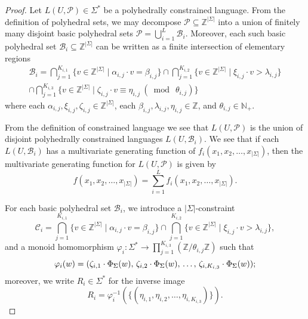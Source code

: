 \begin{proof}	
	Let $L(U,\mathcal{P}) \in \Sigma^*$ be a polyhedrally constrained language.
	From the definition of polyhedral sets, we may decompose $\mathcal{P} \subseteq \mathbb{Z}^{|\Sigma|}$ into a union of finitely many disjoint basic polyhedral sets
	$\mathcal{P} = \bigcup_{i=1}^L \mathcal{B}_i$.
	Moreover, each such basic polyhedral set $\mathcal{B}_i \subseteq \mathbb{Z}^{|\Sigma|}$ can be written as a finite intersection of elementary regions
	\begin{multline*}
		\mathcal{B}_i
		=
		\bigcap_{j = 1}^{K_{i,1}}
		\{
			v \in \mathbb{Z}^{|\Sigma|}
		\mid
			\alpha_{i,j} \cdot v = \beta_{i,j}
		\}
		\cap
		\bigcap_{j = 1}^{K_{i,2}}
		\{
			v \in \mathbb{Z}^{|\Sigma|}
		\mid
			\xi_{i,j} \cdot v > \lambda_{i,j}
		\}
		\\\cap
		\bigcap_{j = 1}^{K_{i,3}}
		\{
			v \in \mathbb{Z}^{|\Sigma|}
		\mid
			\zeta_{i,j} \cdot v \equiv \eta_{i,j}\ (\bmod\ \theta_{i,j})
		\}
	\end{multline*}
	where each $\alpha_{i,j},\xi_{i,j},\zeta_{i,j} \in \mathbb{Z}^{|\Sigma|}$, each $\beta_{i,j},\lambda_{i,j}, \eta_{i,j} \in \mathbb{Z}$, and $\theta_{i,j} \in \mathbb{N}_+$.
	
	From the definition of constrained language we see that $L(U,\mathcal{P})$ is the union of disjoint polyhedrally constrained languages $L(U,\mathcal{B}_i)$.
	We see that if each $L(U,\mathcal{B}_i)$ has a multivariate generating function of $f_i(x_1,x_2,\ldots,x_{|\Sigma|})$, then the multivariate generating function for $L(U,\mathcal{P})$ is given by
	\[
		f(x_1,x_2,\ldots,x_{|\Sigma|})
		=
		\sum_{i=1}^L f_i(x_1,x_2,\ldots,x_{|\Sigma|}).
	\]
	
	For each basic polyhedral set $\mathcal{B}_i$, we introduce a $|\Sigma|$-constraint
	\[
		\mathcal{C}_i
		=
		\bigcap_{j = 1}^{K_{i,1}}
		\{
			v \in \mathbb{Z}^{|\Sigma|}
		\mid
			\alpha_{i,j} \cdot v = \beta_{i,j}
		\}
		\cap
		\bigcap_{j = 1}^{K_{i,2}}
		\{
			v \in \mathbb{Z}^{|\Sigma|}
		\mid
			\xi_{i,j} \cdot v > \lambda_{i,j}
		\},
	\]
	and a monoid homomorphism $\varphi_i \colon \Sigma^* \to \prod_{j=1}^{K_{i,3}} (\mathbb{Z}/\theta_{i,j}\mathbb{Z})$ such that
	\[
		\varphi_i(w)
		=
		(
			\zeta_{i,1} \cdot \Phi_\Sigma(w),\,
			\zeta_{i,2} \cdot \Phi_\Sigma(w),\,
			\ldots,\,
			\zeta_{i,K_{i,3}} \cdot \Phi_\Sigma(w)
		);
	\]
	moreover, we write $R_i \in \Sigma^*$ for the inverse image
	\[
		R_i =
		\varphi_i^{-1}(\{ (\eta_{i,1},\eta_{i,2},\ldots,\eta_{i,K_{i,3}}) \}).
	\]
	

\end{proof}
